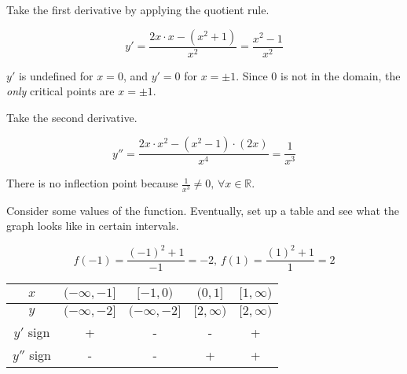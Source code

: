 \documentclass{article}
\begin{document}
\noindent Take the first derivative by applying the quotient rule.

\begin{equation*}y' = \frac{2x\cdot x - (x^2+1)}{x^2}=\frac{x^2-1}{x^2}\end{equation*}

\hfill

\noindent $y'$ is undefined for $x=0$, and $y'=0$ for $x=\pm1$. Since 0 is not in the domain, the \textit{only} critical points are $x=\pm 1$.

\hfill

\noindent Take the second derivative.

\begin{equation*}y'' = \frac{2x\cdot x^2 - (x^2-1)\cdot(2x)}{x^4}=\frac{1}{x^3}\end{equation*}

\hfill

\noindent There is no inflection point because $\displaystyle \frac{1}{x^3} \neq 0, \, \forall x \in \mathbb{R}$.

\hfill

\noindent Consider some values of the function. Eventually, set up a table and see what the graph looks like in certain intervals.

\begin{equation*}f(-1) = \frac{(-1)^2 + 1}{-1} = -2,\,f(1) = \frac{(1)^2 + 1}{1} = 2\end{equation*}

\begin{center}
    \large
    \begin{tabular}{ |c| c c c c| } 
    \hline
        $x$ & $(-\infty, -1]$ & $[-1, 0)$ & $(0, 1]$ &  $[1, \infty)$ \\
        \hline
        $y$ & $(-\infty, -2]$ & $(-\infty, -2]$ & $[2, \infty)$ & $[2, \infty)$\\
        \hline
        $y'$ sign & + & - & - & + \\
        \hline
        $y''$ sign & - & - & + & + \\
        \hline
    \end{tabular}
\end{center}

\hfill
\end{document}
